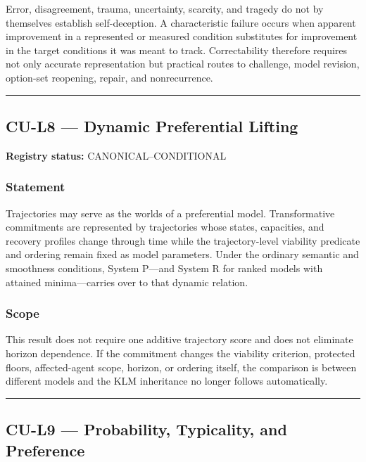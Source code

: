 \documentclass[
  11pt,
]{article}
\begin{document}
Error, disagreement, trauma, uncertainty, scarcity, and tragedy do not
by themselves establish self-deception. A characteristic failure occurs
when apparent improvement in a represented or measured condition
substitutes for improvement in the target conditions it was meant to
track. Correctability therefore requires not only accurate
representation but practical routes to challenge, model revision,
option-set reopening, repair, and nonrecurrence.

\begin{center}\rule{0.5\linewidth}{0.5pt}\end{center}

\subsection{CU-L8 --- Dynamic Preferential
Lifting}\label{cu-l8-dynamic-preferential-lifting}

\textbf{Registry status:} CANONICAL--CONDITIONAL

\subsubsection{Statement}\label{statement-31}

Trajectories may serve as the worlds of a preferential model.
Transformative commitments are represented by trajectories whose states,
capacities, and recovery profiles change through time while the
trajectory-level viability predicate and ordering remain fixed as model
parameters. Under the ordinary semantic and smoothness conditions,
System P---and System R for ranked models with attained minima---carries
over to that dynamic relation.

\subsubsection{Scope}\label{scope-15}

This result does not require one additive trajectory score and does not
eliminate horizon dependence. If the commitment changes the viability
criterion, protected floors, affected-agent scope, horizon, or ordering
itself, the comparison is between different models and the KLM
inheritance no longer follows automatically.

\begin{center}\rule{0.5\linewidth}{0.5pt}\end{center}

\subsection{CU-L9 --- Probability, Typicality, and
Preference}\label{cu-l9-probability-typicality-and-preference}
\end{document}
